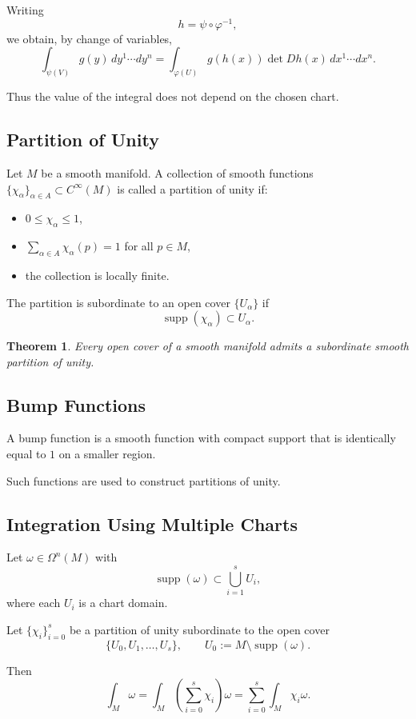 \documentclass[11pt]{report}
\theoremstyle{definition}
\theoremstyle{plain}
\newtheorem{theorem}[definition]{Theorem}
\theoremstyle{remark}
\newcommand{\supp}{\operatorname{supp}}
\begin{document}
Writing
\[
h = \psi \circ \varphi^{-1},
\]
we obtain, by change of variables,
\[
\int_{\psi(V)} g(y)\,dy^1 \cdots dy^n
=
\int_{\varphi(U)} g(h(x)) \det Dh(x)\,dx^1 \cdots dx^n.
\]

Thus the value of the integral does not depend on the chosen chart.

\subsection{Partition of Unity}

Let $M$ be a smooth manifold. A collection of smooth functions $\{\chi_\alpha\}_{\alpha\in A}\subset C^\infty(M)$ is called a partition of unity if:
\begin{itemize}
    \item $0 \le \chi_\alpha \le 1$,
    \item $\sum_{\alpha\in A} \chi_\alpha(p) = 1$ for all $p\in M$,
    \item the collection is locally finite.
\end{itemize}

The partition is subordinate to an open cover $\{U_\alpha\}$ if
\[
\supp(\chi_\alpha)\subset U_\alpha.
\]

\begin{theorem}
Every open cover of a smooth manifold admits a subordinate smooth partition of unity.
\end{theorem}

\subsection{Bump Functions}

A bump function is a smooth function with compact support that is identically equal to $1$ on a smaller region.

Such functions are used to construct partitions of unity.

\subsection{Integration Using Multiple Charts}

Let $\omega \in \Omega^n(M)$ with
\[
\supp(\omega)\subset \bigcup_{i=1}^s U_i,
\]
where each $U_i$ is a chart domain.

Let $\{\chi_i\}_{i=0}^s$ be a partition of unity subordinate to the open cover
\[
\{U_0, U_1, \dots, U_s\}, \qquad U_0 := M \setminus \supp(\omega).
\]

Then
\[
\int_M \omega
=
\int_M \left(\sum_{i=0}^s \chi_i\right)\omega
=
\sum_{i=0}^s \int_M \chi_i \omega.
\]
\end{document}
